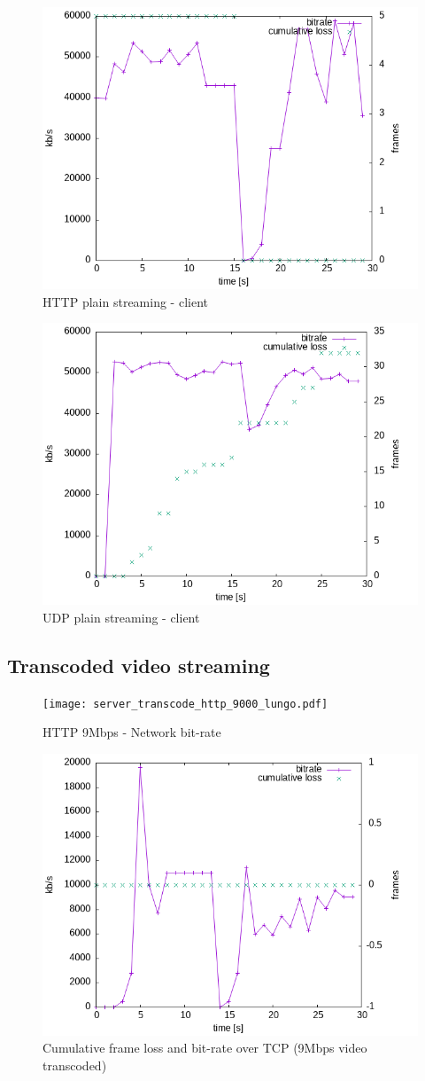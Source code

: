 \documentclass{exam}
\begin{document}
\begin{figure}[H]
    \centering
    \includegraphics[width=0.5\linewidth]{plain_http_client.png}
    \caption{HTTP plain streaming - client}
    \label{fig:plain_http_client}
\end{figure}

\begin{figure}[H]
    \centering
    \includegraphics[width=0.5\linewidth]{plain_udp_client.png}
    \caption{UDP plain streaming - client}
    \label{fig:plain_udp_client}
\end{figure}

\subsection{Transcoded video streaming}


\begin{figure}[H]
    \centering
    \texttt{[image: server\_transcode\_http\_9000\_lungo.pdf]}
    \caption{HTTP 9Mbps -  Network bit-rate}
    \label{fig:server_transcode_http_9000_lungo}
\end{figure}

\begin{figure}[H]
    \centering
    \includegraphics[width=0.5\linewidth]{transcode_http_9000_frame.png}
    \caption{Cumulative frame loss and bit-rate over TCP (9Mbps video transcoded)}
    \label{fig:transcode_http_9000_frame}
\end{figure}
\end{document}

